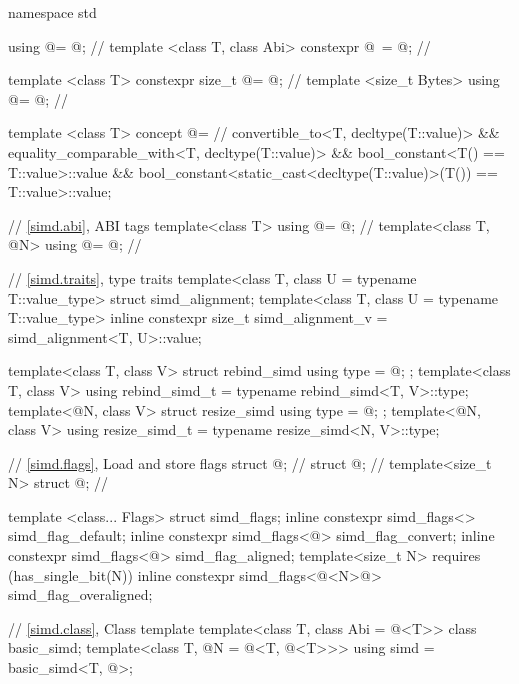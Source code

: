 \begin{codeblock}
namespace std {
  using @\simdsizetype@ = @\seebelow@;                                  // \expos
  template <class T, class Abi> constexpr @\simdsizetype\ \simdsizev@ = @\seebelow@; // \expos

  template <class T> constexpr size_t @\maskelementsize@ = @\seebelow@; // \expos
  template <size_t Bytes> using @\integerfrom@ = @\seebelow@;            // \expos

  template <class T>
    concept @\constexprwrapperlike@ =                                 // \expos
      convertible_to<T, decltype(T::value)> &&
      equality_comparable_with<T, decltype(T::value)> &&
      bool_constant<T() == T::value>::value &&
      bool_constant<static_cast<decltype(T::value)>(T()) == T::value>::value;

  // \ref{simd.abi},  ABI tags
  template<class T> using @\nativeabi@ = @\seebelow@;                    // \expos
  template<class T, @\simdsizetype@ N> using @\deducet@ = @\seebelow@;    // \expos

  // \ref{simd.traits},  type traits
  template<class T, class U = typename T::value_type> struct simd_alignment;
  template<class T, class U = typename T::value_type>
    inline constexpr size_t simd_alignment_v = simd_alignment<T, U>::value;

  template<class T, class V> struct rebind_simd { using type = @\seebelow@; };
  template<class T, class V> using rebind_simd_t = typename rebind_simd<T, V>::type;
  template<@\simdsizetype@ N, class V> struct resize_simd { using type = @\seebelow@; };
  template<@\simdsizetype@ N, class V> using resize_simd_t = typename resize_simd<N, V>::type;

  // \ref{simd.flags}, Load and store flags
  struct @\convertflag@; // \expos
  struct @\alignedflag@; // \expos
  template<size_t N> struct @\overalignedflag@; // \expos

  template <class... Flags> struct simd_flags;
  inline constexpr simd_flags<> simd_flag_default{};
  inline constexpr simd_flags<@\convertflag@> simd_flag_convert{};
  inline constexpr simd_flags<@\alignedflag@> simd_flag_aligned{};
  template<size_t N> requires (has_single_bit(N))
    inline constexpr simd_flags<@\overalignedflag<N>@> simd_flag_overaligned{};

  // \ref{simd.class}, Class template 
  template<class T, class Abi = @\nativeabi@<T>> class basic_simd;
  template<class T, @\simdsizetype@ N = @\simdsizev@<T, @\nativeabi@<T>>>
    using simd = basic_simd<T, @>;

}
\end{codeblock}
